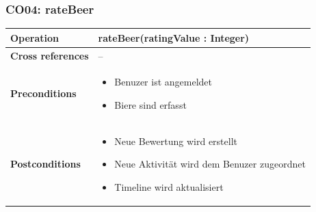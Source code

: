 \documentclass[10pt,a4paper]{scrartcl}
\begin{document}
\subsubsection{CO04: rateBeer}
\begin{tabular}{|l|p{}|}
\hline
 \textbf{Operation} & rateBeer(ratingValue : Integer) \\ 
\hline
\textbf{Cross references} & -- \\ 
\hline 
\textbf{Preconditions} & \begin{itemize}
							\item Benuzer ist angemeldet
							\item Biere sind erfasst 
						 \end{itemize}\\
\hline 
\textbf{Postconditions} & \begin{itemize}
							\item Neue Bewertung wird erstellt
							\item Neue Aktivität wird dem Benuzer zugeordnet
							\item Timeline wird aktualisiert 
						  \end{itemize} \\
\hline
\end{tabular}
\end{document}
